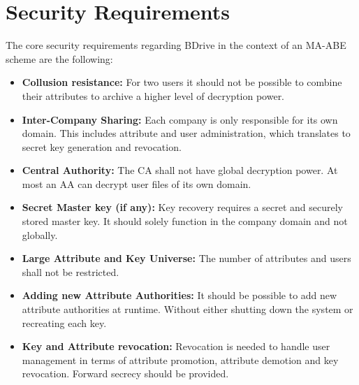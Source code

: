 \documentclass[twocolumn]{article}
\begin{document}
\section{Security Requirements}
\label{sec:securityRequirements}
The core security requirements regarding BDrive in the context of an MA-ABE scheme are the following:
\begin{itemize}
\item \textbf{Collusion resistance:} For two users it should not be possible to combine their attributes to archive a higher level of decryption power.
\item \textbf{Inter-Company Sharing:} Each company is only responsible for its own domain. This includes attribute and user administration, which translates to secret key generation and revocation. %
\item \textbf{Central Authority:} The CA shall not have global decryption power. At most an AA can decrypt user files of its own domain.  
\item \textbf{Secret Master key (if any):} Key recovery requires a secret and securely stored master key. It should solely function in the company domain and not globally. 
\item \textbf{Large Attribute and Key Universe:} The number of attributes and users shall not be restricted.
\item \textbf{Adding new Attribute Authorities:} It should be possible to add new attribute authorities at runtime. Without either shutting down the system or recreating each key.
\item \textbf{Key and Attribute revocation:} Revocation is needed to handle user management in terms of attribute promotion, attribute demotion and key revocation. Forward secrecy should be provided. 
\end{itemize}
\end{document}
